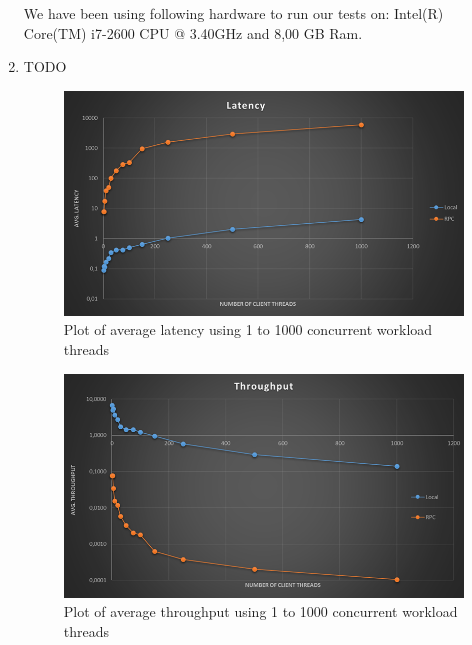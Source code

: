 \documentclass[10pt,a4paper]{article}
\begin{document}
\begin{enumerate}
	We have been using following hardware to run our tests on: Intel(R) Core(TM) i7-2600 CPU @ 3.40GHz and 8,00 GB Ram.
	\item TODO
	\begin{center}
		\begin{figure}
				\includegraphics[scale=0.5]{latency.png}
				\caption{Plot of average latency using 1 to 1000 concurrent workload threads}
		\end{figure}
		\begin{figure}
				\includegraphics[scale=0.5]{throughput.png}
				\caption{Plot of average throughput using 1 to 1000 concurrent workload threads}
		\end{figure}
	\end{center}
\end{enumerate}
\end{document}
